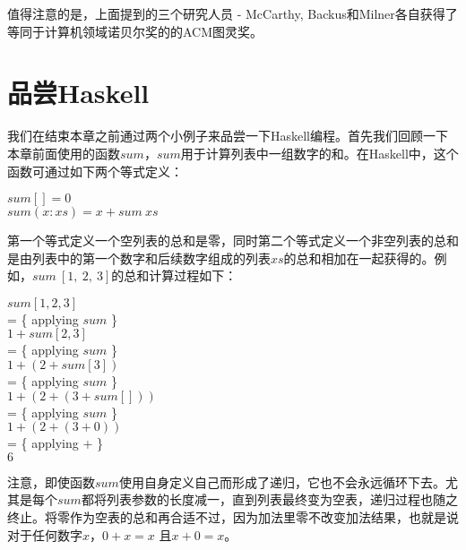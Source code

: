 值得注意的是，上面提到的三个研究人员 - McCarthy, Backus和Milner各自获得了等同于计算机领域诺贝尔奖的的ACM图灵奖。

\section{品尝Haskell}
我们在结束本章之前通过两个小例子来品尝一下Haskell编程。首先我们回顾一下本章前面使用的函数$sum$，$sum$用于计算列表中一组数字的和。在Haskell中，这个函数可通过如下两个等式定义：

\noindent\hspace*{1cm} $sum [] = 0$\\
\hspace*{1cm} $sum (x : xs) = x + sum~xs$

第一个等式定义一个空列表的总和是零，同时第二个等式定义一个非空列表的总和是由列表中的第一个数字和后续数字组成的列表$xs$的总和相加在一起获得的。例如，$sum~[1,~2,~3]$的总和计算过程如下：

\noindent\hspace*{1cm} $sum [1, 2, 3]$\\
\hspace*{1cm} = \{ applying $sum$ \}\\
\hspace*{1cm} $1 + sum [2, 3]$\\
\hspace*{1cm} = \{ applying $sum$ \}\\
\hspace*{1cm} $1 + (2 + sum [3])$\\
\hspace*{1cm} = \{ applying $sum$ \}\\
\hspace*{1cm} $1 + (2 + (3 + sum [ ]))$\\
\hspace*{1cm} = \{ applying $sum$ \}\\
\hspace*{1cm} $1 + (2 + (3 + 0))$\\
\hspace*{1cm} = \{ applying + \}\\
\hspace*{1cm} $6$

注意，即使函数$sum$使用自身定义自己而形成了递归，它也不会永远循环下去。尤其是每个$sum$都将列表参数的长度减一，直到列表最终变为空表，递归过程也随之终止。将零作为空表的总和再合适不过，因为加法里零不改变加法结果，也就是说对于任何数字$x$，$0
+ x = x$ 且$x + 0 = x$。

